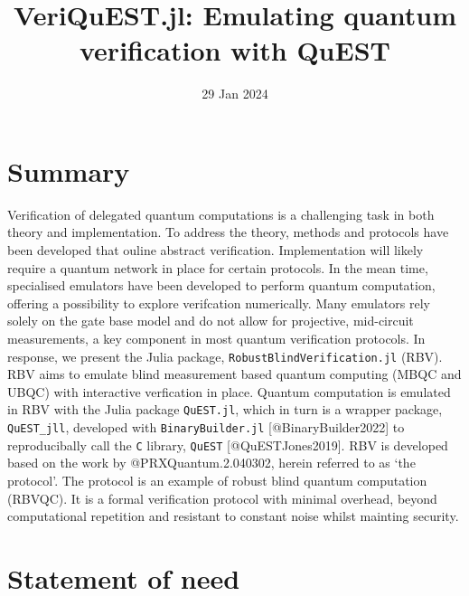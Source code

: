 \documentclass[
]{article}
\title{VeriQuEST.jl: Emulating quantum verification with QuEST}
\author{}
\date{29 Jan 2024}
\begin{document}
\maketitle

\section{Summary}\label{summary}

Verification of delegated quantum computations is a challenging task in
both theory and implementation. To address the theory, methods and
protocols have been developed that ouline abstract verification.
Implementation will likely require a quantum network in place for
certain protocols. In the mean time, specialised emulators have been
developed to perform quantum computation, offering a possibility to
explore verifcation numerically. Many emulators rely solely on the gate
base model and do not allow for projective, mid-circuit measurements, a
key component in most quantum verification protocols. In response, we
present the Julia package, \texttt{RobustBlindVerification.jl} (RBV).
RBV aims to emulate blind measurement based quantum computing (MBQC and
UBQC) with interactive verfication in place. Quantum computation is
emulated in RBV with the Julia package \texttt{QuEST.jl}, which in turn
is a wrapper package, \texttt{QuEST\_jll}, developed with
\texttt{BinaryBuilder.jl} {[}@BinaryBuilder2022{]} to reproducibally
call the \texttt{C} library, \texttt{QuEST} {[}@QuESTJones2019{]}. RBV
is developed based on the work by @PRXQuantum.2.040302, herein referred
to as `the protocol'. The protocol is an example of robust blind quantum
computation (RBVQC). It is a formal verification protocol with minimal
overhead, beyond computational repetition and resistant to constant
noise whilst mainting security.

\section{Statement of need}\label{statement-of-need}
\end{document}
